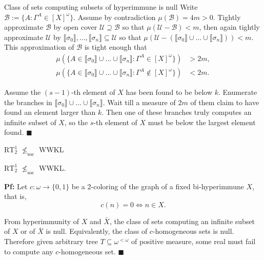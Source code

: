 \begin{frame}{Class of sets computing subsets of hyperimmune is null}
  Write $\mathcal{B} :=\{A: \Gamma^A\in[X]^\omega\}$.
  Assume by contradiction $\mu(\mathcal{B})=4m>0$. Tightly approximate
  $\mathcal{B}$ by open cover $\mathcal{U}\supseteq\mathcal{B}$ so that
  $\mu(\mathcal{U}-\mathcal{B})<m$, then again tightly approximate
  $\mathcal{U}$ by $\llbracket\sigma_0\rrbracket,
  \ldots,\llbracket\sigma_n\rrbracket \subseteq\mathcal{U}$ so
  that $\mu(\mathcal{U}-(\llbracket\sigma_0\rrbracket \cup\ldots
  \cup\llbracket\sigma_n\rrbracket)) <m$. This approximation of
  $\mathcal{B}$ is tight enough that
  \begin{align*}
    \mu(\{A\in\llbracket\sigma_0\rrbracket \cup\ldots\cup
    \llbracket\sigma_n\rrbracket: \Gamma^A\in[X]^\omega\}) &>2m,\\
    \mu(\{A\in\llbracket\sigma_0\rrbracket \cup\ldots\cup
    \llbracket\sigma_n\rrbracket: \Gamma^A\not\in[X]^\omega\}) &<2m.
  \end{align*}

  Assume the $(s-1)$-th element of $X$ has been found to be below $k$.
  Enumerate the branches in $\llbracket\sigma_0\rrbracket \cup\ldots\cup
  \llbracket\sigma_n\rrbracket$.  Wait
  till a measure of $2m$ of them claim to have found an element larger than
  $k$. Then one of these branches truly computes an infinite subset of
  $X$, so the $s$-th element of $X$ must be below the largest element
  found. $\blacksquare$
\end{frame}

\begin{frame}{$\text{RT}_2^1$ $\nleq_{\text{soc}}$ WWKL}
  \begin{thm}
    $\text{RT}_2^1$ $\nleq_{\text{soc}}$ WWKL.
  \end{thm}

  \vspace{1em}
  \textbf{Pf:} Let $c:\omega\rightarrow\{0,1\}$ be a 2-coloring of the
  graph of a fixed bi-hyperimmune $X$, that is,
  \[c(n)=0 \Leftrightarrow n\in X.\]
  
  From hyperimmunity of $X$ and $\bar{X}$, the class of sets computing an
  infinite subset of $X$ or of $\bar{X}$ is null. Equivalently, the class
  of $c$-homogeneous sets is null. Therefore given arbitrary tree
  $T\subseteq\omega^{<\omega}$ of positive measure, some real must fail to
  compute any $c$-homogeneous set. $\blacksquare$
\end{frame}

